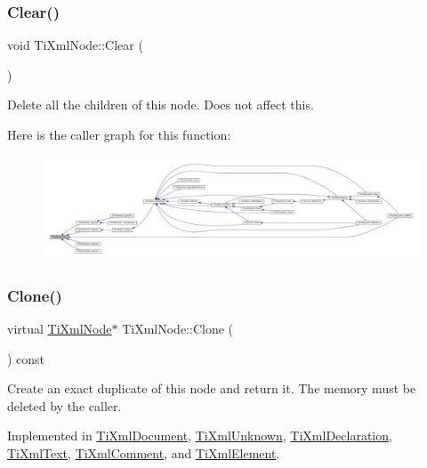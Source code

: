 \subsubsection{\texorpdfstring{Clear()}{Clear()}}
{\footnotesize\ttfamily void Ti\+Xml\+Node\+::\+Clear (\begin{DoxyParamCaption}{ }\end{DoxyParamCaption})}



Delete all the children of this node. Does not affect \textquotesingle{}this\textquotesingle{}. 

Here is the caller graph for this function\+:\nopagebreak
\begin{figure}[H]
\begin{center}
\leavevmode
\includegraphics[width=350pt]{class_ti_xml_node_a708e7f953df61d4d2d12f73171550a4b_icgraph}
\end{center}
\end{figure}
\mbox{\label{class_ti_xml_node_a4508cc3a2d7a98e96a54cc09c37a78a4}} 
\subsubsection{\texorpdfstring{Clone()}{Clone()}}
{\footnotesize\ttfamily virtual \hyperlink{class_ti_xml_node}{Ti\+Xml\+Node}$\ast$ Ti\+Xml\+Node\+::\+Clone (\begin{DoxyParamCaption}{ }\end{DoxyParamCaption}) const\hspace{0.3cm}{\ttfamily [pure virtual]}}

Create an exact duplicate of this node and return it. The memory must be deleted by the caller. 

Implemented in \hyperlink{class_ti_xml_document_a46a4dda6c56eb106d46d4046ae1e5353}{Ti\+Xml\+Document}, \hyperlink{class_ti_xml_unknown_a3dea7689de5b1931fd6657992948fde0}{Ti\+Xml\+Unknown}, \hyperlink{class_ti_xml_declaration_a35dc1455f69b79e81cae28e186944610}{Ti\+Xml\+Declaration}, \hyperlink{class_ti_xml_text_a98a20d7a4f1c1478e25e34921be24bfe}{Ti\+Xml\+Text}, \hyperlink{class_ti_xml_comment_a1f9f06e2ed3f77875093436193b16c16}{Ti\+Xml\+Comment}, and \hyperlink{class_ti_xml_element_a810ea8fa40844c01334e5af2a26794cb}{Ti\+Xml\+Element}.

